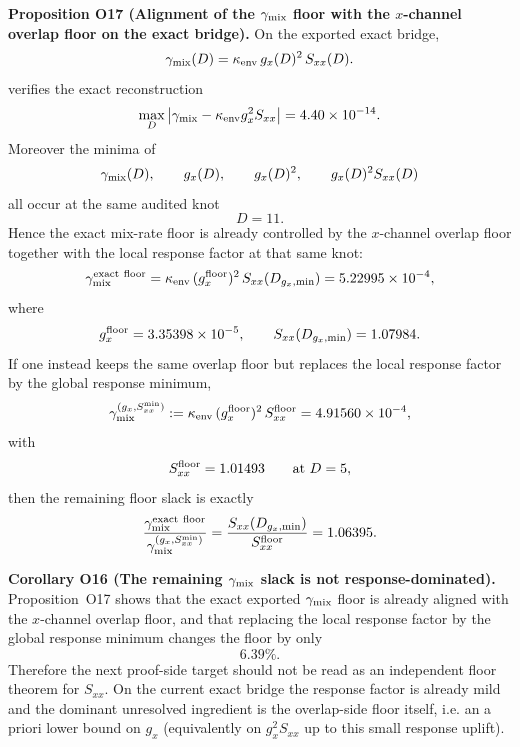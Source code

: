 \documentclass[aps,prd,onecolumn,notitlepage,nofootinbib,superscriptaddress,11pt,floatfix]{revtex4-2}
\begin{document}
\medskip\noindent\textbf{Proposition O17 (Alignment of the \texorpdfstring{$\gamma_{\rm mix}$}{gamma_mix} floor with the \texorpdfstring{$x$}{x}-channel overlap floor on the exact bridge).}
On the exported exact bridge,
\[
\gamma_{\rm mix}(D)=\kappa_{\rm env}\,g_x(D)^2\,S_{xx}(D).
\]
 verifies the exact reconstruction
\[
\max_D \left|\gamma_{\rm mix}-\kappa_{\rm env} g_x^2 S_{xx}\right|
=4.40\times10^{-14}.
\]
Moreover the minima of
\[
\gamma_{\rm mix}(D),\qquad
g_x(D),\qquad
g_x(D)^2,\qquad
g_x(D)^2S_{xx}(D)
\]
all occur at the same audited knot
\[
D=11.
\]
Hence the exact mix-rate floor is already controlled by the $x$-channel overlap floor together with the local response factor at that same knot:
\[
\gamma_{\rm mix}^{\rm exact\ floor}
=
\kappa_{\rm env}\,(g_x^{\rm floor})^2\,S_{xx}(D_{g_x,\min})
=5.22995\times10^{-4},
\]
where
\[
g_x^{\rm floor}=3.35398\times10^{-5},
\qquad
S_{xx}(D_{g_x,\min})=1.07984.
\]
If one instead keeps the same overlap floor but replaces the local response factor by the global response minimum,
\[
\gamma_{\rm mix}^{(g_x,S_{xx}^{\min})}
:=
\kappa_{\rm env}\,(g_x^{\rm floor})^2\,S_{xx}^{\rm floor}
=4.91560\times10^{-4},
\]
with
\[
S_{xx}^{\rm floor}=1.01493
\qquad\text{at }D=5,
\]
then the remaining floor slack is exactly
\[
\frac{\gamma_{\rm mix}^{\rm exact\ floor}}
{\gamma_{\rm mix}^{(g_x,S_{xx}^{\min})}}
=
\frac{S_{xx}(D_{g_x,\min})}{S_{xx}^{\rm floor}}
=1.06395.
\]

\medskip\noindent\textbf{Corollary O16 (The remaining \texorpdfstring{$\gamma_{\rm mix}$}{gamma_mix} slack is not response-dominated).}
Proposition~O17 shows that the exact exported \texorpdfstring{$\gamma_{\rm mix}$}{gamma_mix} floor is already aligned with the $x$-channel overlap floor, and that replacing the local response factor by the global response minimum changes the floor by only
\[
6.39\%.
\]
Therefore the next proof-side target should not be read as an independent floor theorem for $S_{xx}$.  On the current exact bridge the response factor is already mild and the dominant unresolved ingredient is the overlap-side floor itself, i.e. an a priori lower bound on $g_x$ (equivalently on $g_x^2S_{xx}$ up to this small response uplift).
\end{document}
